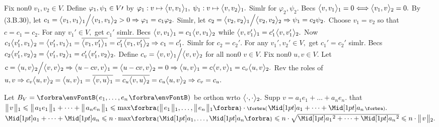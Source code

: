 Fix non0 $v_1,v_2\in V.$ Define $\varphi_1,\psi_1\in V\prime$ by $\varphi_1:v\mapsto\big\langle{}v,v_1{}\big\rangle{_1},\;\psi_1:v\mapsto\big\langle{}v,v_2{}\big\rangle{_1}.$ Simlr for $\varphi_2,\psi_2.$\parSol{}
Becs $\big\langle{}v,v_1{}\big\rangle{_1}=0\Longleftrightarrow\big\langle{}v_1,v{}\big\rangle{_2}=0.$ By (3.B.30), let $c_1=\big\langle{}v_1,v_1{}\big\rangle{_1}\Big/\big\langle{}v_1,v_1{}\big\rangle{_2}>0\Rightarrow\varphi_1=c_1\varphi_2.$\parSol{}
Simlr, let $c_2=\big\langle{}v_2,v_2{}\big\rangle{_1}\Big/\big\langle{}v_2,v_2{}\big\rangle{_2}\Rightarrow\psi_1=c_2\psi_2.$ Choose $v_1=v_2$ so that $c=c_1=c_2.$\vspace{3pt}\parSol{}
For any $v_1'\in V,$ get $c_1'$ simlr. Becs $\big\langle{}v,v_1{}\big\rangle{_1}=c_1\:\!\big\langle{}v,v_1{}\big\rangle{_2}$ while $\big\langle{}v,v_1'{}\big\rangle{_1}=c_1'\:\!\big\langle{}v,v_1'{}\big\rangle{_2}.$\vspace{1pt}\parSol{}
Now $c_1\big\langle{}v_1',v_1{}\big\rangle{_2}=\big\langle{}v_1',v_1{}\big\rangle{_1}=\overline{\big\langle{}v_1,v_1'{}\big\rangle{_1}}=\overline{c_1'\:\!\big\langle{}v_1,v_1'{}\big\rangle{_2}}\Rightarrow c_1=c_1'.$ Simlr for $c_2=c_2'.$\PfEnd\vspace{2pt}\parSol{}
\Or For any $v_1',v_2'\in V,$ get $c_1'=c_2'$ simlr. Becs $c_2\big\langle{}v_1',v_2{}\big\rangle{_2}=\big\langle{}v_1',v_2{}\big\rangle{_1}=c_1'\big\langle{}v_1',v_2{}\big\rangle{_2}.$\PfEnd\vspace{6pt}\parSol{}
\Or Define $c_v=\big\langle{}v,v{}\big\rangle{_1}\Big/\big\langle{}v,v{}\big\rangle{_2}$ for all non0 $v\in V.$ Fix non0 $u,v\in V.$\parSol{}
Let $c=\big\langle{}u,v{}\big\rangle{_2}\Big/\big\langle{}v,v{}\big\rangle{_2}\Rightarrow\big\langle{}u-cv,v{}\big\rangle{_1}=\big\langle{}u-cv,v{}\big\rangle{_2}=0\Rightarrow\big\langle{}u,v{}\big\rangle{_1}=c\big\langle{}v,v{}\big\rangle{_1}=c_v\big\langle{}u,v{}\big\rangle{_2}.$\vspace{1pt}\parSol{}
Rev the roles of $u,v\Rightarrow c_v\big\langle{}u,v{}\big\rangle{_2}={\big\langle{}u,v{}\big\rangle{_1}}=\overline{\big\langle{}v,u{}\big\rangle{_1}}=\overline{c_u\big\langle{}v,u{}\big\rangle{_2}}=c_u\big\langle{}u,v{}\big\rangle{_2}\Rightarrow c_v=c_u.$\PfEnd
\SepLine\pagebreak

Let $B_V=\Par{e_1,\dots,e_n}$ be orthon wrto $\big\langle{}\cdot,\cdot{}\big\rangle{_2}.$ Supp $v=a_1e_1+\dots+a_ne_n.$\vspace{1pt}\parSol{}
\NOTICE that $\Dvert{v}{_1}\leqslant\Dvert{a_1e_1}{_1}+\dots+\Dvert{a_ne_n}{_1}\leqslant\max\!\Bra{\Dvert{e_1}{_1},\dots,\Dvert{e_n}{_1}}\cdot\BigPar{\aMid{a_1}+\dots+\aMid{a_n}}.$\vspace{3pt}\parSol{}
\又 $\aMid{a_1}+\dots+\aMid{a_n}\leqslant n\cdot\max\!\Bra{\aMid{a_1},\dots,\aMid{a_n}}\leqslant n\cdot\sqrt{\aMidsq{a_1}+\dots+\aMidsq{a_n}}\leqslant n\cdot\Dvert{v}{_2}.$\PfEnd
\SepLine

